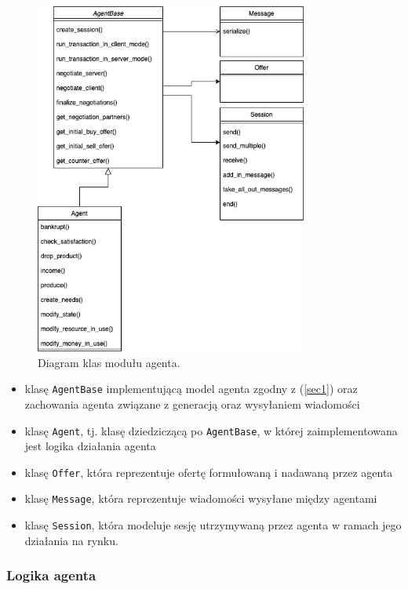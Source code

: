 \documentclass{article}
\begin{document}
\begin{figure}[H]
	\centering
	\includegraphics[width=0.8\textwidth, height=0.8\textheight]{./agent-uml.png}
	\caption{Diagram klas modułu agenta.}
	\label{uml-agent}
\end{figure}

\begin{itemize}
	\item klasę \texttt{AgentBase} implementującą model agenta zgodny z (\ref{sec1}) oraz zachowania agenta
		związane z generacją oraz wysyłaniem wiadomości
	\item klasę \texttt{Agent}, tj. klasę dziedziczącą po \texttt{AgentBase}, w której zaimplementowana jest logika 
		działania agenta
	\item klasę \texttt{Offer}, która reprezentuje ofertę formułowaną i nadawaną przez agenta
	\item klasę \texttt{Message}, która reprezentuje wiadomości wysyłane między agentami
	\item klasę \texttt{Session}, która modeluje sesję utrzymywaną przez agenta w ramach jego działania na rynku. 
\end{itemize}

\subsubsection{Logika agenta}
\end{document}
